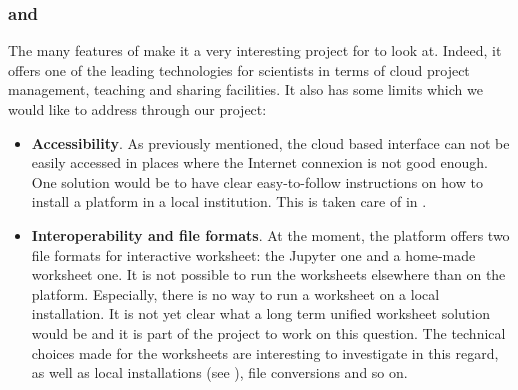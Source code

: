 \documentclass{deliverablereport}
\begin{document}
\subsubsection{\SMC and \ODK}

The many features of \SMC make it a very interesting project for \ODK
to look at. Indeed, it offers one of the leading technologies for
scientists in terms of cloud project management, teaching and sharing
facilities. It also has some limits which we would like to address
through our project:

\begin{itemize}
\item \textbf{Accessibility}. As previously mentioned, the cloud based
  interface can not be easily accessed in places where the Internet
  connexion is not good enough. One solution would be to have clear
  easy-to-follow instructions on how to install a \SMC platform in a
  local institution. This is taken care of in
  .

\item \textbf{Interoperability and file formats}. At the moment, the
  \SMC platform offers two file formats for interactive worksheet: the
  Jupyter one and a home-made \Sage worksheet one. It is not possible
  to run the \Sage worksheets elsewhere than on the
  platform. Especially, there is no way to run a \Sage worksheet on a
  local \Sage installation. It is not yet clear what a long term
  unified worksheet solution would be and it is part of the \ODK
  project to work on this question. The technical choices made for the
  \Sage worksheets are interesting to investigate in this regard, as
  well as local \SMC installations (see
  ), file conversions
  and so on.
\end{itemize}
\end{document}
